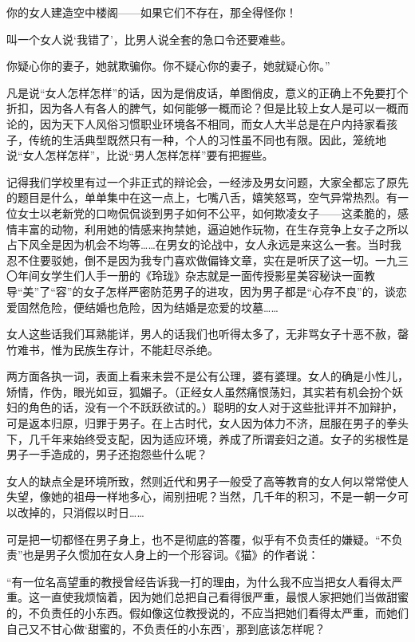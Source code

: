 \par 你的女人建造空中楼阁——如果它们不存在，那全得怪你！
\par 叫一个女人说‘我错了’，比男人说全套的急口令还要难些。
\par 你疑心你的妻子，她就欺骗你。你不疑心你的妻子，她就疑心你。”
\par 凡是说“女人怎样怎样”的话，因为是俏皮话，单图俏皮，意义的正确上不免要打个折扣，因为各人有各人的脾气，如何能够一概而论？但是比较上女人是可以一概而论的，因为天下人风俗习惯职业环境各不相同，而女人大半总是在户内持家看孩子，传统的生活典型既然只有一种，个人的习性虽不同也有限。因此，笼统地说“女人怎样怎样”，比说“男人怎样怎样”要有把握些。
\par 记得我们学校里有过一个非正式的辩论会，一经涉及男女问题，大家全都忘了原先的题目是什么，单单集中在这一点上，七嘴八舌，嬉笑怒骂，空气异常热烈。有一位女士以老新党的口吻侃侃谈到男子如何不公平，如何欺凌女子——这柔脆的，感情丰富的动物，利用她的情感来拘禁她，逼迫她作玩物，在生存竞争上女子之所以占下风全是因为机会不均等……在男女的论战中，女人永远是来这么一套。当时我忍不住要驳她，倒不是因为我专门喜欢做偏锋文章，实在是听厌了这一切。一九三〇年间女学生们人手一册的《玲珑》杂志就是一面传授影星美容秘诀一面教导“美”了“容”的女子怎样严密防范男子的进攻，因为男子都是“心存不良”的，谈恋爱固然危险，便结婚也危险，因为结婚是恋爱的坟墓……
\par 女人这些话我们耳熟能详，男人的话我们也听得太多了，无非骂女子十恶不赦，罄竹难书，惟为民族生存计，不能赶尽杀绝。
\par 两方面各执一词，表面上看来未尝不是公有公理，婆有婆理。女人的确是小性儿，矫情，作伪，眼光如豆，狐媚子。（正经女人虽然痛恨荡妇，其实若有机会扮个妖妇的角色的话，没有一个不跃跃欲试的。）聪明的女人对于这些批评并不加辩护，可是返本归原，归罪于男子。在上古时代，女人因为体力不济，屈服在男子的拳头下，几千年来始终受支配，因为适应环境，养成了所谓妾妇之道。女子的劣根性是男子一手造成的，男子还抱怨些什么呢？
\par 女人的缺点全是环境所致，然则近代和男子一般受了高等教育的女人何以常常使人失望，像她的祖母一样地多心，闹别扭呢？当然，几千年的积习，不是一朝一夕可以改掉的，只消假以时日……
\par 可是把一切都怪在男子身上，也不是彻底的答覆，似乎有不负责任的嫌疑。“不负责”也是男子久惯加在女人身上的一个形容词。《猫》的作者说：
\par “有一位名高望重的教授曾经告诉我一打的理由，为什么我不应当把女人看得太严重。这一直使我烦恼着，因为她们总把自己看得很严重，最恨人家把她们当做甜蜜的，不负责任的小东西。假如像这位教授说的，不应当把她们看得太严重，而她们自己又不甘心做‘甜蜜的，不负责任的小东西’，那到底该怎样呢？
